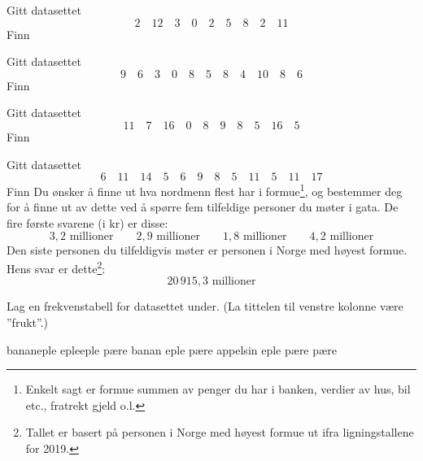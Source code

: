 




\opgt

\nes \nes

Gitt datasettet
\[ 2\quad12\quad 3\quad 0\quad 2\quad 5\quad 8\quad2\quad 11 \]
Finn \os
{}

Gitt datasettet
	\[ 9\quad6\quad 3\quad 0\quad 8\quad 5\quad 8\quad4\quad 10\quad 8 \quad 6 \]
Finn \os
{}

Gitt datasettet
\[ 11\quad7\quad 16\quad 0\quad 8\quad 9\quad 8\quad5\quad 16\quad 5 \]
Finn \os
{}

Gitt datasettet
\[ 6\quad11\quad 14\quad 5\quad 6\quad 9\quad 8\quad5\quad 11\quad 5\quad 11\quad 17 \]
Finn \os
{}
\newpage
{}
Du ønsker å finne ut hva nordmenn flest har i formue\footnote{Enkelt sagt er formue summen av penger du har i banken, verdier av hus, bil etc., fratrekt gjeld o.l.}, og bestemmer deg for å finne ut av dette ved å spørre fem tilfeldige personer du møter i gata. De fire første svarene (i kr) er disse:
\[ 3,2\text{ millioner}\qquad 2,9\text{ millioner}\qquad 1,8\text{ millioner}\qquad 4,2\text{ millioner}  \]
Den siste personen du tilfeldigvis møter er personen i Norge med høyest formue. Hens svar er dette\footnote{Tallet er basert på personen i Norge med høyest formue ut ifra ligningstallene for 2019.}:
\[ 20\,915,3\text{ millioner} \]

Lag en frekvenstabell for datasettet under. (La tittelen til venstre kolonne være ''frukt''.)
\begin{center}
	banan\quad eple \quad eple\quad eple \quad pære \quad banan \quad eple \quad pære \quad appelsin \quad eple \quad pære \quad pære
\end{center}

